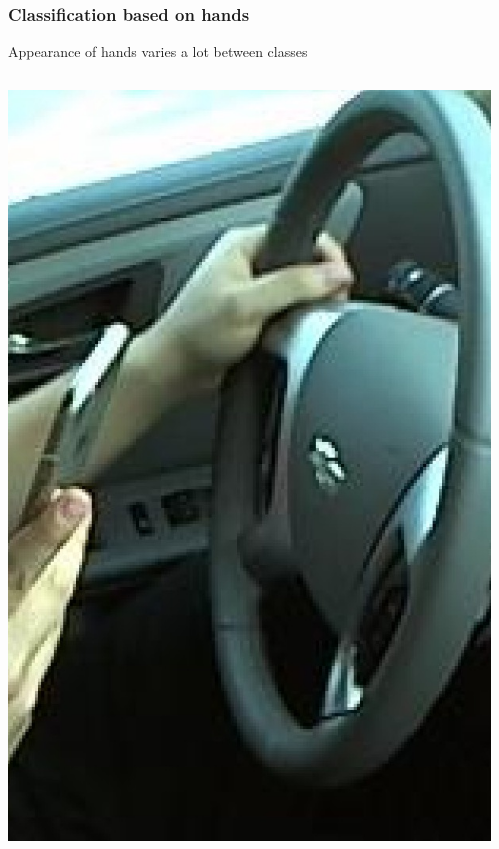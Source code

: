 \documentclass{beamer}
\begin{document}
	\begin{frame}
		\frametitle{Classification based on hands}
		Appearance of hands varies a lot between classes
		\begin{columns}
			\begin{column}{0.5\textwidth}
				\begin{center}
					\includegraphics[height=0.5\textheight]{handpose_example_1_cut}\\			
				\end{center}
			\end{column}
			\begin{column}{0.5\textwidth}
				\begin{center}

\end{center}
\end{column}
\end{columns}
\end{frame}
\end{document}
